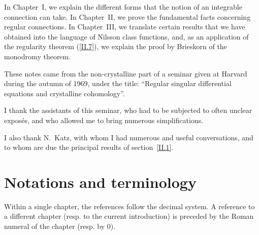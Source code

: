 \documentclass{report}
\theoremstyle{plain}
\theoremstyle{definition}
\newcommand{\oldpage}[1]{\marginpar{\footnotesize$\Big\vert$ \textit{p.~#1}}}
\begin{document}
In Chapter~I, we explain the different forms that the notion of an integrable connection can take.
In Chapter~II, we prove the fundamental facts concerning regular connections.
In Chapter~III, we translate certain results that we have obtained into the language of Nilsson class functions, and, as an application of the regularity theorem (\cref{II.7}), we explain the proof by Brieskorn \cite{5} of the monodromy theorem.

These notes came from the non-crystalline part of a seminar given at Harvard during the autumn of 1969, under the title: ``Regular singular differential equations and crystalline cohomology''.

I thank the assistants of this seminar, who had to be subjected to often unclear expos\'{e}s, and who allowed me to bring numerous simplifications.

I also thank N.~Katz, with whom I had numerous and useful conversations, and to whom are due the principal results of section~\cref{II.1}.


\section*{Notations and terminology}

\oldpage{2}
Within a single chapter, the references follow the decimal system.
A reference to a different chapter (resp. to the current introduction) is preceded by the Roman numeral of the chapter (resp. by 0).
\end{document}
